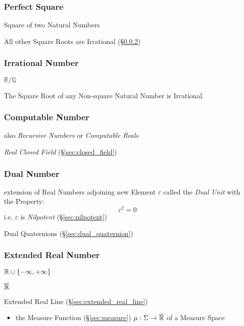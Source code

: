 \subsubsection{Perfect Square}\label{sec:perfect_square}

Square of two Natural Numbers

All other Square Roots are Irrational (\S\ref{sec:irrational})



\subsubsection{Irrational Number}\label{sec:irrational}

$\mathbb{R}/\mathbb{Q}$

The Square Root of any Non-square Natural Number is Irrational.



\subsubsection{Computable Number}\label{sec:computable_real}

also \emph{Recursive Numbers} or \emph{Computable Reals}

\emph{Real Closed Field} (\S\ref{sec:closed_field})



\subsubsection{Dual Number}\label{sec:dual_number}

extension of Real Numbers adjoining new Element $\varepsilon$ called the
\emph{Dual Unit} with the Property:
\[
  \varepsilon^2 = 0
\]
i.e. $\varepsilon$ is \emph{Nilpotent} (\S\ref{sec:nilpotent})

\fist Dual Quaternions (\S\ref{sec:dual_quaternion})



\subsubsection{Extended Real Number}\label{sec:extended_real}

$\mathbb{R} \cup \{-\infty, +\infty\}$

$\overline{\mathbb{R}}$

Extended Real Line (\S\ref{sec:extended_real_line})

\begin{itemize}
  \item the Measure Function (\S\ref{sec:measure}) $\mu : \Sigma \rightarrow
    \overline{\mathbb{R}}$ of a Measure Space
\end{itemize}



